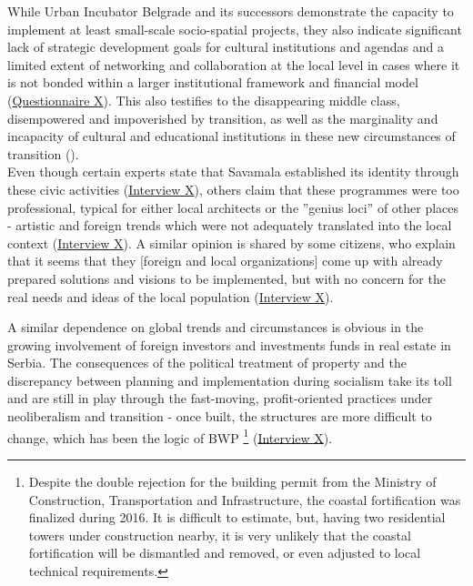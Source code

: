 \documentclass[11pt]{report}
\begin{document}
\begin{itemize}
While Urban Incubator Belgrade and its successors demonstrate the capacity to implement at least small-scale socio-spatial projects, they also indicate significant lack of strategic development goals for cultural institutions and agendas and a limited extent of networking and collaboration at the local level in cases where it is not bonded within a larger institutional framework and financial model (\href{Questionnaire Experts post-socialist}{Questionnaire X}).
This also testifies to the disappearing middle class, disempowered and impoverished by transition, as well as the marginality and incapacity of cultural and educational institutions in these new circumstances of transition (\href{Doytchinov}{\citealt{doytchinov_belgrade_2015}}).
\\
Even though certain experts state that Savamala established its identity through these civic activities (\href{InterviewX}{Interview X}),
others claim that these programmes were too professional, typical for either local architects or the ”genius loci” of other places - artistic and foreign trends which were not adequately translated into the local context (\href{InterviewX}{Interview X}).
A similar opinion is shared by some citizens, who explain that it seems that they [foreign and local organizations] come up with already prepared solutions and visions to be implemented, but with no concern for the real needs and ideas of the local population (\href{InterviewX}{Interview X}).

A similar dependence on global trends and circumstances is obvious in the growing involvement of foreign investors and investments funds in real estate in Serbia. The consequences of the political treatment of property and the discrepancy between planning and implementation during socialism take its toll and are still in play through the fast-moving, profit-oriented practices under neoliberalism and transition - once built, the structures are more difficult to change, which has been the logic of BWP
\footnote{Despite the double rejection for the building permit from the Ministry of Construction, Transportation and Infrastructure, the coastal fortification was finalized during 2016. It is difficult to estimate, but, having two residential towers under construction nearby, it is very unlikely that the coastal fortification will be dismantled and removed, or even adjusted to local technical requirements.}
(\href{InterviewX}{Interview X}).
\\


\end{itemize}
\end{document}
